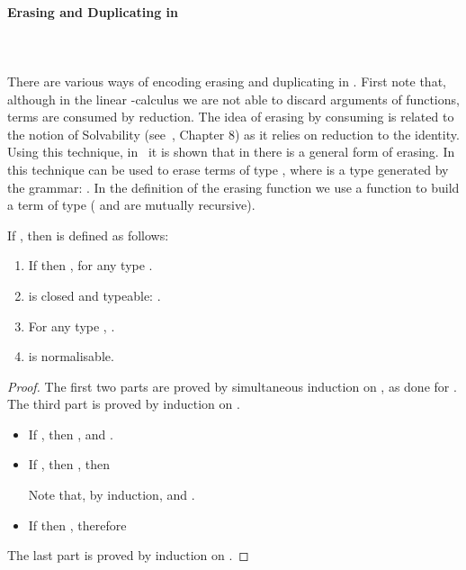 \documentclass{article}
\begin{document}
\paragraph*{Erasing and Duplicating in }\ \\\ \\
There are various ways of encoding erasing and duplicating in .
First note that, although in the linear -calculus we are not able to discard
arguments of functions, terms are consumed by reduction. The idea of
erasing by consuming is related to the notion of Solvability
(see~\cite{BarendregtHP:lamcss}, Chapter 8)  as it relies on
reduction to the identity. Using this technique,
in~\cite{AlvesS:phd,AlvesS:TCS} it is shown that in \LLCI there is a
general form of erasing. In  this technique can be used to erase 
 terms of type , where  is a type generated by the grammar:
. In the definition of the erasing function  we use a function  to build a term of type  ( and  are mutually
recursive).

\begin{definition}[Erasing] If , then
   is defined as follows:

\end{definition}

\begin{theorem}
\label{thm:erase1}
\begin{enumerate}
\item
If  then , for any type .
\item  is  closed and typeable: . 
\item
For any type , . 
\item  is normalisable.
\end{enumerate}
\end{theorem}

\begin{proof}
The first two parts are proved by simultaneous induction on , as done for \LLCI\cite{AlvesS:TCS}.
The third part is proved by induction on .\begin{itemize}
\item If , then , and .
\item If , then , then 

Note that, by induction,  and .
\item  If   then , therefore\\

\end{itemize}
The last part is proved by induction on .
\end{proof}
\end{document}
